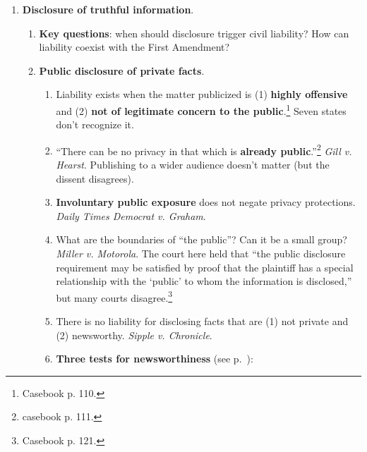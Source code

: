 \begin{enumerate}
\begin{enumerate}
\begin{enumerate}
        \end{enumerate}
        \item \textbf{Video Voyeurism Prevention Act}: prevents intentionally 
        capturing images of intimate areas under circumstances (1) where the 
        person believed he could disrobe in privacy or (2) where intimate 
        areas would not be visible to the public.\footnote{Casebook pp. 
        107--108.}
    \end{enumerate}
    \item \textbf{Disclosure of truthful information}.
    \begin{enumerate}
        \item \textbf{Key questions}: when should disclosure trigger civil 
        liability? How can liability coexist with the First Amendment?
        \item \textbf{Public disclosure of private facts}.
        \begin{enumerate}
            \item Liability exists when the matter publicized is (1) 
            \textbf{highly offensive} and (2) \textbf{not of legitimate 
            concern to the public}.\footnote{Casebook p. 110.} Seven states 
            don't recognize it.
            \item ``There can be no privacy in that which is \textbf{already 
            public}.''\footnote{casebook p. 111.} \emph{Gill v. Hearst}. 
            Publishing to a wider audience doesn't matter (but the dissent 
            disagrees).
            \item \textbf{Involuntary public exposure} does not negate privacy 
            protections. \emph{Daily Times Democrat v. Graham}.
            \item What are the boundaries of ``the public''? Can it be a small 
            group? \emph{Miller v. Motorola}. The court here held that ``the 
            public disclosure requirement may be satisfied by proof that the 
            plaintiff has a special relationship with the `public' to whom the 
            information is disclosed,'' but many courts 
            disagree.\footnote{Casebook p. 121.}
            \item There is no liability for disclosing facts that are (1) not 
            private and (2) newsworthy. \emph{Sipple v. Chronicle}.
            \item \textbf{Three tests for newsworthiness} (see 
            p.~\pageref{par:newsworthiness}):
            \begin{enumerate}

\end{enumerate}
\end{enumerate}
\end{enumerate}
\end{enumerate}
